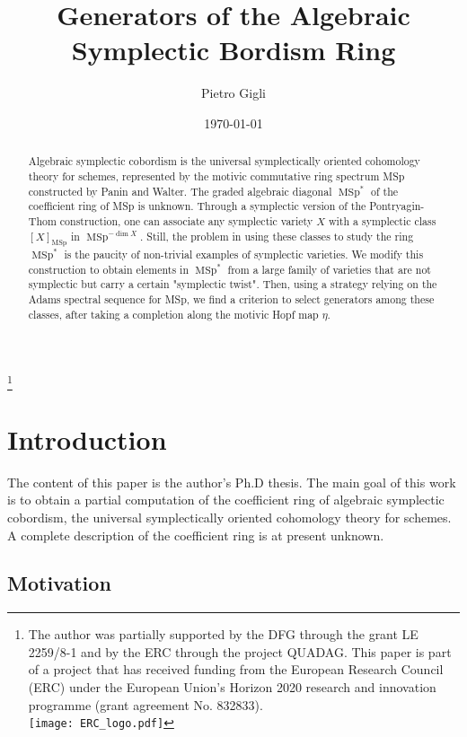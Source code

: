 \documentclass[10pt]{amsart}
\title{Generators of the Algebraic Symplectic Bordism Ring}
\date{\today}
\author{Pietro Gigli}
\theoremstyle{definition}
\theoremstyle{plain}
\numberwithin{equation}{section}
\newcommand{\0}{\emptyset}
\newcommand{\MSp}{{\operatorname{MSp}}}
\renewcommand{\dim}{{\operatorname{dim}}}
\begin{document}
\begin{abstract}
    Algebraic symplectic cobordism is the universal symplectically oriented cohomology theory for schemes, represented by the motivic commutative ring spectrum MSp constructed by Panin and Walter. The graded algebraic diagonal $\MSp^*$ of the coefficient ring of MSp is unknown. Through a symplectic version of the Pontryagin-Thom construction, one can associate any symplectic variety $X$ with a symplectic class $[X]_\MSp$ in $\MSp^{-\dim X}$. Still, the problem in using these classes to study the ring $\MSp^*$ is the paucity of non-trivial examples of symplectic varieties. We modify this construction to obtain elements in $\MSp^*$ from a large family of varieties that are not symplectic but carry a certain "symplectic twist". Then, using a strategy relying on the Adams spectral sequence for MSp, we find a criterion to select generators among these classes, after taking a completion along the motivic Hopf map $\eta$.
\end{abstract}

\thanks{The author was partially supported by the DFG through the grant  LE 2259/8-1 and by the ERC through the project QUADAG.  This paper is part of a project that has received funding from the European Research Council (ERC) under the European Union's Horizon 2020 research and innovation programme (grant agreement No. 832833).\\
\texttt{[image: ERC\_logo.pdf]}}

\maketitle

\tableofcontents

\section{Introduction}

The content of this paper is the author's Ph.D thesis. The main goal of this work is to obtain a partial computation of the coefficient ring of algebraic symplectic cobordism, the universal symplectically oriented cohomology theory for schemes. A complete description of the coefficient ring is at present unknown.

\subsection*{Motivation}
\end{document}
